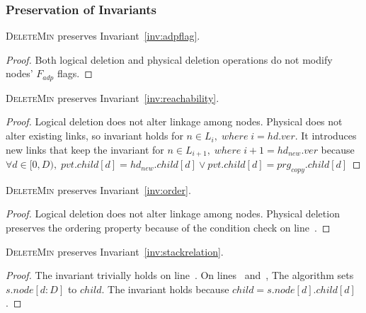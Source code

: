 \documentclass[10pt,journal,letter,compsoc]{IEEEtran}
\begin{document}
\subsubsection{Preservation of Invariants}
\noindent \textsc{DeleteMin} preserves Invariant~\ref{inv:adpflag}.
\begin{proof}
    Both logical deletion and physical deletion operations do not modify nodes' $F_{adp}$ flags.
\end{proof}

\noindent\textsc{DeleteMin} preserves Invariant~\ref{inv:reachability}.
\begin{proof}
    Logical deletion does not alter linkage among nodes.
    Physical does not alter existing links, so invariant holds for $n \in L_i,\;where\;i=hd.ver$.
    It introduces new links that keep the invariant for $n \in L_{i+1},\;where\;i+1=hd_{new}.ver$ because $\forall d \in [0,D),\;pvt.child[d] =hd_{new}.child[d] \lor pvt.child[d]=prg_{copy}.child[d]$
\end{proof}

\noindent\textsc{DeleteMin} preserves Invariant~\ref{inv:order}.
\begin{proof}
    Logical deletion does not alter linkage among nodes.
    Physical deletion preserves the ordering property because of the condition check on line~.
\end{proof}

\noindent\textsc{DeleteMin} preserves Invariant~\ref{inv:stackrelation}.
\begin{proof}
    The invariant trivially holds on line~.
    On lines~ and~, The algorithm sets $s.node[d:D]$ to $child$.
    The invariant holds because $child = s.node[d].child[d]$.
\end{proof}
\end{document}
